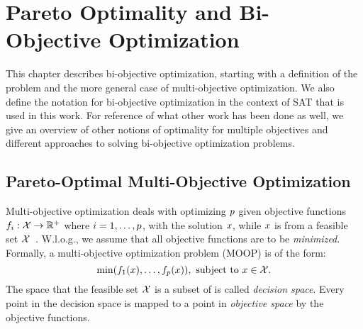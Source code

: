 \chapter{Pareto Optimality and Bi-Objective Optimization\label{chap:biobjective-optimization}}

This chapter describes bi-objective optimization, starting with a definition of the problem and the more general case of multi-objective optimization.
We also define the notation for bi-objective optimization in the context of SAT that is used in this work.
For reference of what other work has been done as well, we give an overview of other notions of optimality for multiple objectives and different approaches to solving bi-objective optimization problems.

\section{Pareto-Optimal Multi-Objective Optimization\label{sec:multiopt}}

Multi-objective optimization deals with optimizing $p$ given objective functions $f_i: \mathcal{X} \rightarrow \mathbb{R}^+$ where $i=1,\dots,p$, with the solution $x$, while $x$ is from a feasible set $\mathcal{X}$~\autocite{Ehrgott2005-1}.
W.l.o.g., we assume that all objective functions are to be \emph{minimized}.
Formally, a multi-objective optimization problem (MOOP) is of the form:
\begin{equation}\label{eq:moop}
  \min (f_1(x),\dots,f_p(x)),\ \text{subject to}\ x\in \mathcal{X}.
\end{equation}
The space that the feasible set $\mathcal{X}$ is a subset of is called \emph{decision space}.
Every point in the decision space is mapped to a point in \emph{objective space} by the objective functions.

